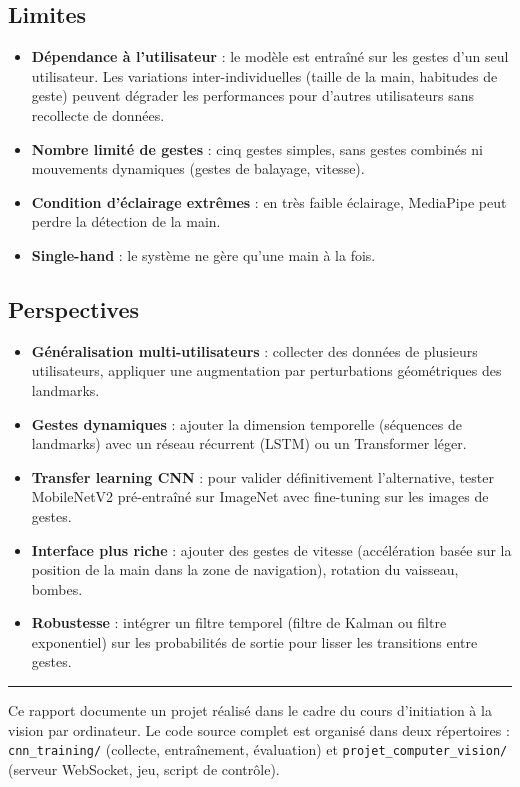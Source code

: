 \documentclass[12pt, a4paper]{article}
\newcommand{\code}[1]{\texttt{\small #1}}
\begin{document}
\subsection{Limites}

\begin{itemize}
  \item \textbf{Dépendance à l'utilisateur} : le modèle est entraîné sur les
        gestes d'un seul utilisateur. Les variations inter-individuelles (taille
        de la main, habitudes de geste) peuvent dégrader les performances pour
        d'autres utilisateurs sans recollecte de données.
  \item \textbf{Nombre limité de gestes} : cinq gestes simples, sans gestes
        combinés ni mouvements dynamiques (gestes de balayage, vitesse).
  \item \textbf{Condition d'éclairage extrêmes} : en très faible éclairage,
        MediaPipe peut perdre la détection de la main.
  \item \textbf{Single-hand} : le système ne gère qu'une main à la fois.
\end{itemize}

\subsection{Perspectives}

\begin{itemize}
  \item \textbf{Généralisation multi-utilisateurs} : collecter des données de
        plusieurs utilisateurs, appliquer une augmentation par perturbations
        géométriques des landmarks.
  \item \textbf{Gestes dynamiques} : ajouter la dimension temporelle (séquences
        de landmarks) avec un réseau récurrent (LSTM) ou un Transformer léger.
  \item \textbf{Transfer learning CNN} : pour valider définitivement l'alternative,
        tester MobileNetV2 pré-entraîné sur ImageNet avec fine-tuning sur les
        images de gestes.
  \item \textbf{Interface plus riche} : ajouter des gestes de vitesse (accélération
        basée sur la position de la main dans la zone de navigation), rotation du
        vaisseau, bombes.
  \item \textbf{Robustesse} : intégrer un filtre temporel (filtre de Kalman ou
        filtre exponentiel) sur les probabilités de sortie pour lisser les
        transitions entre gestes.
\end{itemize}

\vspace{1cm}
\hrule
\vspace{0.5cm}
{\small
Ce rapport documente un projet réalisé dans le cadre du cours d'initiation à la
vision par ordinateur. Le code source complet est organisé dans deux répertoires :
\code{cnn\_training/} (collecte, entraînement, évaluation) et
\code{projet\_computer\_vision/} (serveur WebSocket, jeu, script de contrôle).
}
\end{document}
